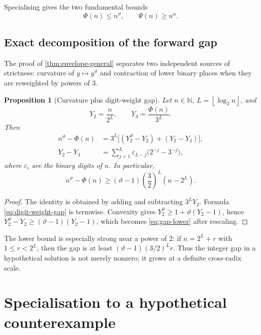 \documentclass[11pt]{article}
\newtheorem{proposition}[theorem]{Proposition}
\theoremstyle{definition}
\theoremstyle{remark}
\newcommand{\N}{\mathbb N}
\newcommand{\floor}[1]{\left\lfloor #1\right\rfloor}
\newcommand{\PhiMap}{\Phi}
\newcommand{\PsiMap}{\Psi}
\newcommand{\thetaAE}{\vartheta}
\newcommand{\alphaAE}{\alpha}
\begin{document}
Specialising gives the two fundamental bounds
\begin{equation}\label{eq:two-envelopes}
  \boxed{\PhiMap(n)\le n^{\thetaAE}},
  \qquad
  \boxed{\PsiMap(n)\ge n^{\alphaAE}}.
\end{equation}

\subsection{Exact decomposition of the forward gap}

The proof of \cref{thm:envelope-general} separates two independent sources of
strictness: curvature of $y\mapsto y^{\thetaAE}$ and contraction of lower
binary places when they are reweighted by powers of $3$.

\begin{proposition}[Curvature plus digit-weight gap]\label{prop:gap-decomposition}
Let $n\in\N$, $L=\floor{\log_2n}$, and
\[
  Y_2=\frac{n}{2^L},\qquad
  Y_3=\frac{\PhiMap(n)}{3^L}.
\]
Then
\begin{align}
 n^{\thetaAE}-\PhiMap(n)
 &=3^L\bigl[(Y_2^{\thetaAE}-Y_2)+(Y_2-Y_3)\bigr],
 \label{eq:gap-decomp}\\
 Y_2-Y_3
 &=\sum_{j=1}^{L}\varepsilon_{L-j}
     \bigl(2^{-j}-3^{-j}\bigr),
 \label{eq:digit-weight-gap}
\end{align}
where $\varepsilon_i$ are the binary digits of $n$.  In particular,
\begin{equation}\label{eq:gap-lower}
 n^{\thetaAE}-\PhiMap(n)
 \ge(\thetaAE-1)\left(\frac32\right)^L(n-2^L).
\end{equation}
\end{proposition}

\begin{proof}
The identity is obtained by adding and subtracting $3^LY_2$.  Formula
\eqref{eq:digit-weight-gap} is termwise.  Convexity gives
$Y_2^{\thetaAE}\ge1+\thetaAE(Y_2-1)$, hence
$Y_2^{\thetaAE}-Y_2\ge(\thetaAE-1)(Y_2-1)$, which becomes
\eqref{eq:gap-lower} after rescaling.
\end{proof}

The lower bound is especially strong near a power of $2$: if
$n=2^L+r$ with $1\le r<2^L$, then the gap is at least
$(\thetaAE-1)(3/2)^Lr$.  Thus the integer gap in a hypothetical solution is
not merely nonzero; it grows at a definite cross-radix scale.

\section{Specialisation to a hypothetical counterexample}
\end{document}
